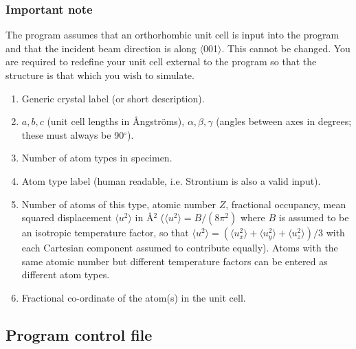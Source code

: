\documentclass[12pt,a4paper]{article}
\begin{document}
\subsubsection{Important note} 

The program assumes that an orthorhombic unit cell is input into the program and that the incident beam direction is along $\langle$001$\rangle$.
This cannot be changed.
You are required to redefine your unit cell external to the program so that the structure is that which you wish to simulate.

\begin{enumerate}
\item{Generic crystal label (or short description).}
\item{$a,b,c$ (unit cell lengths in {\AA}ngstr\"oms), $\alpha, \beta, \gamma$ (angles between axes in degrees; these must always be 90$^\circ$).}
\item{ Number of atom types in specimen.}
\item{ Atom type label (human readable,  i.e. Strontium is also a valid input).}
\item{ Number of atoms of this type, atomic number $Z$, fractional occupancy, mean squared displacement $\langle u^2 \rangle$ in {\AA}$^2$ ($\langle u^2\rangle  = B / (8 \pi^2)$ where $B$ is assumed to be an isotropic temperature factor, so that $\langle u^2 \rangle  = (\langle u_x^2\rangle+\langle u_y^2\rangle+\langle u_z^2\rangle)/3$ with each Cartesian component assumed to contribute equally). Atoms with the same atomic number but different temperature factors can be entered as different atom types.}
\item{ Fractional co-ordinate of the atom(s) in the unit cell.}

\end{enumerate}
%






\subsection{Program control file}\label{userinput}
\end{document}
